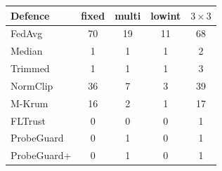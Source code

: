 \begin{tabular}{@{}lcccc@{}}
\toprule
Defence & fixed & multi & lowint & $3\times3$\\
\midrule
FedAvg & 70 & 19 & 11 & 68\\
Median & 1 & 1 & 1 & 2\\
Trimmed & 1 & 1 & 1 & 3\\
NormClip & 36 & 7 & 3 & 39\\
M-Krum & 16 & 2 & 1 & 17\\
FLTrust & 0 & 0 & 0 & 1\\
ProbeGuard & 0 & 1 & 0 & 1\\
ProbeGuard+ & 0 & 1 & 0 & 1\\
\bottomrule
\end{tabular}